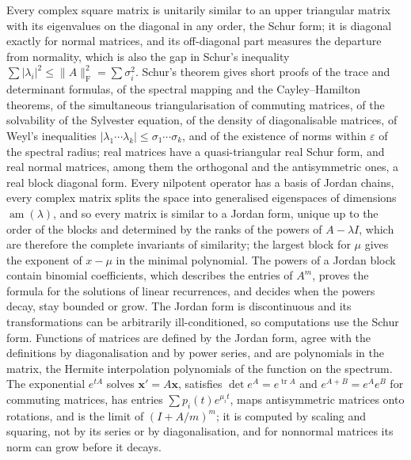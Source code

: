 \bigskip
Every complex square matrix is unitarily similar to an upper triangular matrix with its eigenvalues on the diagonal in any order, the Schur form; it is diagonal exactly for normal matrices, and its off-diagonal part measures the departure from normality, which is also the gap in Schur's inequality $\sum|\lambda_i|^2\le\|A\|_{\mathrm F}^2=\sum\sigma_i^2$. Schur's theorem gives short proofs of the trace and determinant formulas, of the spectral mapping and the Cayley--Hamilton theorems, of the simultaneous triangularisation of commuting matrices, of the solvability of the Sylvester equation, of the density of diagonalisable matrices, of Weyl's inequalities $|\lambda_1\cdots\lambda_k|\le\sigma_1\cdots\sigma_k$, and of the existence of norms within $\varepsilon$ of the spectral radius; real matrices have a quasi-triangular real Schur form, and real normal matrices, among them the orthogonal and the antisymmetric ones, a real block diagonal form. Every nilpotent operator has a basis of Jordan chains, every complex matrix splits the space into generalised eigenspaces of dimensions $\operatorname{am}(\lambda)$, and so every matrix is similar to a Jordan form, unique up to the order of the blocks and determined by the ranks of the powers of $A-\lambda I$, which are therefore the complete invariants of similarity; the largest block for $\mu$ gives the exponent of $x-\mu$ in the minimal polynomial. The powers of a Jordan block contain binomial coefficients, which describes the entries of $A^m$, proves the formula for the solutions of linear recurrences, and decides when the powers decay, stay bounded or grow. The Jordan form is discontinuous and its transformations can be arbitrarily ill-conditioned, so computations use the Schur form. Functions of matrices are defined by the Jordan form, agree with the definitions by diagonalisation and by power series, and are polynomials in the matrix, the Hermite interpolation polynomials of the function on the spectrum. The exponential $e^{tA}$ solves $\mathbf x'=A\mathbf x$, satisfies $\det e^A=e^{\operatorname{tr}A}$ and $e^{A+B}=e^Ae^B$ for commuting matrices, has entries $\sum p_i(t)e^{\mu_it}$, maps antisymmetric matrices onto rotations, and is the limit of $(I+A/m)^m$; it is computed by scaling and squaring, not by its series or by diagonalisation, and for nonnormal matrices its norm can grow before it decays.

